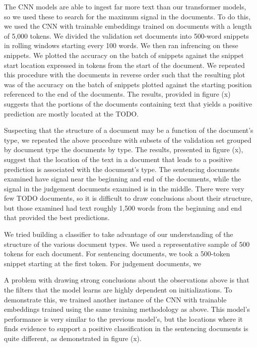 \documentclass[twocolumn,10pt]{wmrDoc}
\begin{document}
The CNN models are able to ingest far more text than our transformer models, so we used these to search for the maximum signal in the documents.  To do this, we used the CNN with trainable embeddings trained on documents with a length of 5,000 tokens.  We divided the validation set documents into 500-word snippets in rolling windows starting every 100 words.  We then ran infrencing on these snippets.  We plotted the accuracy on the batch of snippets against the snippet start location expressed in tokens from the start of the document.  We repeated this procedure with the documents in reverse order such that the resulting plot was of the accuracy on the batch of snippets plotted against the starting position referenced to the end of the documents.  The results, provided in figure (x) suggests that the portions of the documents containing text that yields a positive prediction are mostly located at the TODO.

Suspecting that the structure of a document may be a function of the document's type, we repeated the above procedure with subsets of the validation set grouped by document type the documents by type.  The results, presented in figure (x), suggest that the location of the text in a document that leads to a positive prediction is associated with the document's type.  The sentencing documents examined have signal near the beginning and end of the documents, while the signal in the judgement documents examined is in the middle.  There were very few TODO documents, so it is difficult to draw conclusions about their structure, but those examined had text roughly 1,500 words from the beginning and end that provided the best predictions.

We tried building a classifier to take advantage of our understanding of the structure of the various document types.  We used a representative sample of 500 tokens for each document.  For sentencing documents, we took a 500-token snippet starting at the first token.  For judgement documents, we 

A problem with drawing strong conclusions about the observations above is that the filters that the model learns are highly dependent on initializations.  To demonstrate this, we trained another instance of the CNN with trainable embeddings trained using the same training methodology as above.  This model's performance is very similar to the previous model's, but the locations where it finds evidence to support a positive classification in the sentencing documents is quite different, as demonstrated in figure (x).
\end{document}
